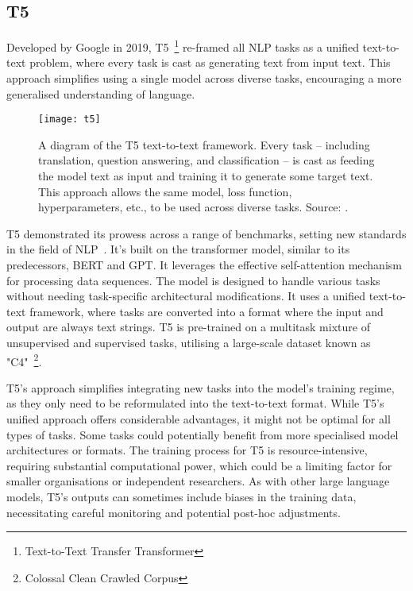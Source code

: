 \subsection{T5}
\label{subsec:t5}

Developed by Google in 2019, T5~\footnote{Text-to-Text Transfer Transformer} re-framed all NLP tasks as a unified text-to-text problem, where every task is cast as generating text from input text.
This approach simplifies using a single model across diverse tasks, encouraging a more generalised understanding of language.

\begin{figure}[h!]
	\centering
	\texttt{[image: t5]}
	\caption{A diagram of the T5 text-to-text framework. Every task -- including translation, question answering, and classification -- is cast as feeding the model text as input and training it to generate some target text. This approach allows the same model, loss function, hyperparameters, etc., to be used across diverse tasks. Source: \textcite{raffel2023exploring}.}
	\label{fig:t5-t2t}
\end{figure}

T5 demonstrated its prowess across a range of benchmarks, setting new standards in the field of NLP~\cite{raffel2023exploring}.
It's built on the transformer model, similar to its predecessors, BERT and GPT. It leverages the effective self-attention mechanism for processing data sequences.
The model is designed to handle various tasks without needing task-specific architectural modifications.
It uses a unified text-to-text framework, where tasks are converted into a format where the input and output are always text strings.
T5 is pre-trained on a multitask mixture of unsupervised and supervised tasks, utilising a large-scale dataset known as "C4"~\footnote{Colossal Clean Crawled Corpus}.

T5's approach simplifies integrating new tasks into the model's training regime, as they only need to be reformulated into the text-to-text format.
While T5's unified approach offers considerable advantages, it might not be optimal for all types of tasks.
Some tasks could potentially benefit from more specialised model architectures or formats.
The training process for T5 is resource-intensive, requiring substantial computational power, which could be a limiting factor for smaller organisations or independent researchers.
As with other large language models, T5's outputs can sometimes include biases in the training data, necessitating careful monitoring and potential post-hoc adjustments.

